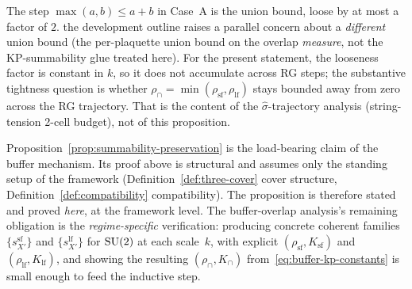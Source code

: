 \begin{remark}
\label{rem:union-bound-looseness}
The step $\max(a, b) \le a + b$ in Case~A is the union bound, loose by at most a factor of $2$.  the development outline raises a parallel concern about a \emph{different} union bound (the per-plaquette union bound on the overlap \emph{measure}, not the KP-summability glue treated here).  For the present statement, the looseness factor is constant in $k$, so it does not accumulate across RG steps; the substantive tightness question is whether $\rho_{\cap} = \min(\rho_{\mathrm{sf}}, \rho_{\mathrm{lf}})$ stays bounded away from zero across the RG trajectory.  That is the content of the $\widehat\sigma$-trajectory analysis (string-tension 2-cell budget), not of this proposition.
\end{remark}

\begin{remark}
\label{rem:summability-discharge}
Proposition~\ref{prop:summability-preservation} is the load-bearing claim of the buffer mechanism.  Its proof above is structural and assumes only the standing setup of the framework (Definition~\ref{def:three-cover} cover structure, Definition~\ref{def:compatibility} compatibility).  The proposition is therefore stated and proved \emph{here}, at the framework level.  The buffer-overlap analysis's remaining obligation is the \emph{regime-specific} verification: producing concrete coherent families $\{s^{\mathrm{sf}}_{X'}\}$ and $\{s^{\mathrm{lf}}_{X'}\}$ for $\mathrm{SU}(2)$ at each scale~$k$, with explicit $(\rho_{\mathrm{sf}}, K_{\mathrm{sf}})$ and $(\rho_{\mathrm{lf}}, K_{\mathrm{lf}})$, and showing the resulting $(\rho_{\cap}, K_{\cap})$ from~\eqref{eq:buffer-kp-constants} is small enough to feed the inductive step.
\end{remark}

